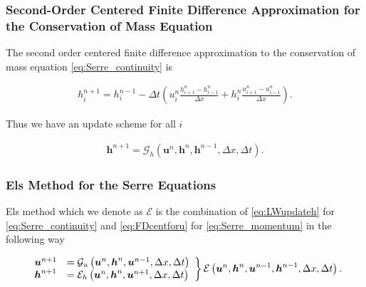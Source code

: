 \documentclass[SingleSpace,12pt,Proceedings]{Serre_ASCE}
\begin{document}
\subsubsection{Second-Order Centered Finite Difference Approximation for the Conservation of Mass Equation}
The second order centered finite difference approximation to the conservation of mass equation \eqref{eq:Serre_continuity} is
\begin{linenomath*}
	\begin{gather*}
	h^{n+1}_i = h^{n-1}_i - \Delta t \left(u^{n}_{i}\frac{h^{n}_{i+1} - h^{n}_{i-1}}{\Delta x} + h^{n}_{i}\frac{u^{n}_{i+1} - u^{n}_{i-1}}{\Delta x}\right).
	\end{gather*}
\end{linenomath*}
Thus we have an update scheme for all $i$
\begin{linenomath*}
	\begin{gather}
	\label{eq:secondFDappformass}
	\boldsymbol{h}^{n+1} = \mathcal{G}_h\left(\boldsymbol{u}^n,\boldsymbol{h}^n,\boldsymbol{h}^{n-1} ,\Delta x, \Delta t \right).
	\end{gather}
\end{linenomath*}

\subsubsection{Els Method for the Serre Equations}
Els method \cite{El-etal-2006} which we denote as $\mathcal{E}$ is the combination of \eqref{eq:LWupdateh} for \eqref{eq:Serre_continuity} and \eqref{eq:FDcentforu} for \eqref{eq:Serre_momentum} in the following way
\begin{linenomath*}
	\begin{gather}
	\left.
	\begin{array}{l l}
	\boldsymbol{u}^{n+1}&=\mathcal{G}_u\left(\boldsymbol{u}^n,\boldsymbol{h}^n, \boldsymbol{u}^{n-1}, \Delta x, \Delta t \right) \\
	\boldsymbol{h}^{n+1}&=\mathcal{E}_h\left(\boldsymbol{u}^n,\boldsymbol{h}^n,\boldsymbol{u}^{n+1}, \Delta x, \Delta t \right)
	\end{array} \right\rbrace \mathcal{E}\left(\boldsymbol{u}^n,\boldsymbol{h}^n, \boldsymbol{u}^{n-1},\boldsymbol{h}^{n-1}, \Delta x, \Delta t \right).
	\label{eq:Enumdef}
	\end{gather}
\end{linenomath*}
\end{document}
